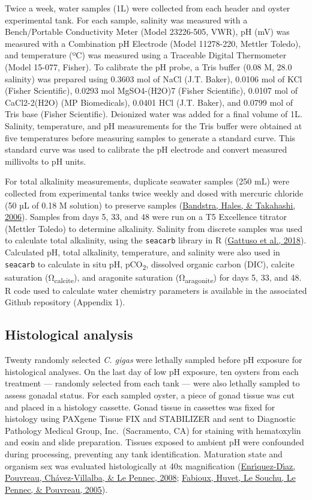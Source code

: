 \documentclass [11pt, proquest] {uwthesis}[2015/03/03]
\begin{document}
Twice a week, water samples (1L) were collected from each header and oyster experimental tank. For each sample, salinity was measured with a Bench/Portable Conductivity Meter (Model 23226-505, VWR), pH (mV) was measured with a Combination pH Electrode (Model 11278-220, Mettler Toledo), and temperature (ºC) was measured using a Traceable Digital Thermometer (Model 15-077, Fisher). To calibrate the pH probe, a Tris buffer (0.08 M, 28.0 salinity) was prepared using 0.3603 mol of NaCl (J.T. Baker), 0.0106 mol of KCl (Fisher Scientific), 0.0293 mol MgSO4-(H2O)7 (Fisher Scientific), 0.0107 mol of CaCl2-2(H2O) (MP Biomedicals), 0.0401 HCl (J.T. Baker), and 0.0799 mol of Tris base (Fisher Scientific). Deionized water was added for a final volume of 1L. Salinity, temperature, and pH measurements for the Tris buffer were obtained at five temperatures before measuring samples to generate a standard curve. This standard curve was used to calibrate the pH electrode and convert measured millivolts to pH units.

For total alkalinity measurements, duplicate seawater samples (250 mL) were collected from experimental tanks twice weekly and dosed with mercuric chloride (50 µL of 0.18 M solution) to preserve samples (\protect\hyperlink{ref-Bandstra2006}{Bandstra, Hales, \& Takahashi, 2006}). Samples from days 5, 33, and 48 were run on a T5 Excellence titrator (Mettler Toledo) to determine alkalinity. Salinity from discrete samples was used to calculate total alkalinity, using the \texttt{seacarb} library in R (\protect\hyperlink{ref-Gattuso2018}{Gattuso et al., 2018}). Calculated pH, total alkalinity, temperature, and salinity were also used in \texttt{seacarb} to calculate in situ pH, pCO\textsubscript{2}, dissolved organic carbon (DIC), calcite saturation (Ω\textsubscript{calcite}), and aragonite saturation (Ω\textsubscript{aragonite}) for days 5, 33, and 48. R code used to calculate water chemistry parameters is available in the associated Github repository (Appendix 1).

\hypertarget{histological-analysis}{%
\subsection{Histological analysis}\label{histological-analysis}}

Twenty randomly selected \emph{C. gigas} were lethally sampled before pH exposure for histological analyses. On the last day of low pH exposure, ten oysters from each treatment --- randomly selected from each tank --- were also lethally sampled to assess gonadal status. For each sampled oyster, a piece of gonad tissue was cut and placed in a histology cassette. Gonad tissue in cassettes was fixed for histology using PAXgene Tissue FIX and STABILIZER and sent to Diagnostic Pathology Medical Group, Inc.~(Sacramento, CA) for staining with hematoxylin and eosin and slide preparation. Tissues exposed to ambient pH were confounded during processing, preventing any tank identification. Maturation state and organism sex was evaluated histologically at 40x magnification (\protect\hyperlink{ref-Enriquez-Diaz2008}{Enrı́quez-Dı́az, Pouvreau, Chávez-Villalba, \& Le Pennec, 2008}; \protect\hyperlink{ref-Fabioux2005}{Fabioux, Huvet, Le Souchu, Le Pennec, \& Pouvreau, 2005}).
\end{document}
